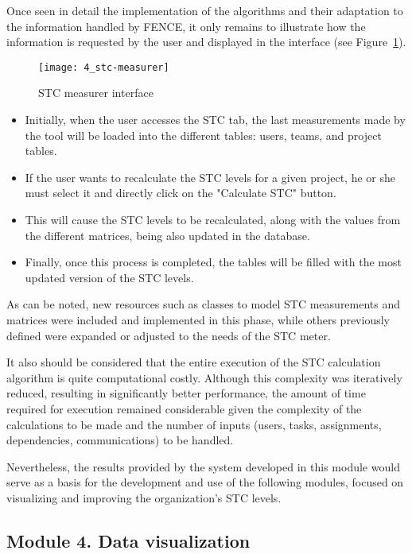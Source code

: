 Once seen in detail the implementation of the algorithms and their adaptation to the information handled by FENCE, it only remains to illustrate how the information is requested by the user and displayed in the interface (see Figure~\ref{fig:stc-measurer}).

\begin{figure}
	\centering
	\texttt{[image: 4\_stc-measurer]}
	\caption[STC measurer interface]{STC measurer interface}
	\label{fig:stc-measurer}
\end{figure}

\begin{itemize}
\item Initially, when the user accesses the STC tab, the last measurements made by the tool will be loaded into the different tables: users, teams, and project tables. 
\item If the user wants to recalculate the STC levels for a given project, he or she must select it and directly click on the "Calculate STC" button. 
\item This will cause the STC levels to be recalculated, along with the values from the different matrices, being also updated in the database. 
\item Finally, once this process is completed, the tables will be filled with the most updated version of the STC levels.
\end{itemize}

As can be noted, new resources such as classes to model STC measurements and matrices were included and implemented in this phase, while others previously defined were expanded or adjusted to the needs of the STC meter.

It also should be considered that the entire execution of the STC calculation algorithm is quite computational costly. Although this complexity was iteratively reduced, resulting in significantly better performance, the amount of time required for execution remained considerable given the complexity of the calculations to be made and the number of inputs (users, tasks, assignments, dependencies, communications) to be handled.

Nevertheless, the results provided by the system developed in this module would serve as a basis for the development and use of the following modules, focused on visualizing and improving the organization's STC levels.

\subsection{Module 4. Data visualization}

